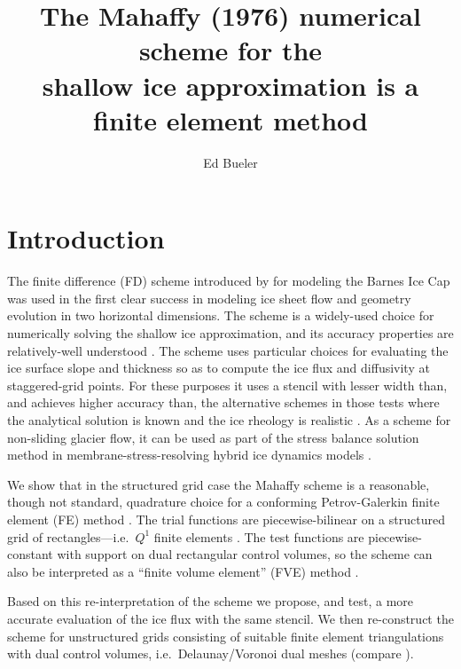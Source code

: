 \documentclass[11pt]{amsart}
\title[The Mahaffy scheme is a finite element method]{The Mahaffy (1976) numerical scheme for the \\ shallow ice approximation is a finite element method}
\author{Ed Bueler}
\begin{document}

\maketitle

\thispagestyle{empty}


\section{Introduction}

The finite difference (FD) scheme introduced by \cite{Mahaffy1976} for modeling the Barnes Ice Cap was used in the first clear success in modeling ice sheet flow and geometry evolution in two horizontal dimensions.  The scheme is a widely-used choice for numerically solving the shallow ice approximation, and its accuracy properties are relatively-well understood \cite{Bueleretal2005}.  The scheme uses particular choices for evaluating the ice surface slope and thickness so as to compute the ice flux and diffusivity at staggered-grid points.  For these purposes it uses a stencil with lesser width than, and achieves higher accuracy than, the alternative schemes in those tests where the analytical solution is known and the ice rheology is realistic \cite{HindmarshPayne1996}.  As a scheme for non-sliding glacier flow, it can be used as part of the stress balance solution method in membrane-stress-resolving hybrid ice dynamics models \cite{BuelerBrown2009}.

We show that in the structured grid case the Mahaffy scheme is a reasonable, though not standard, quadrature choice for a conforming Petrov-Galerkin finite element (FE) method \cite{Elmanetal2005}.  The trial functions are piecewise-bilinear on a structured grid of rectangles---i.e.~$Q^1$ finite elements \cite{Elmanetal2005}.  The test functions are piecewise-constant with support on dual rectangular control volumes, so the scheme can also be interpreted as a ``finite volume element'' (FVE) method \cite{EwingLinLin2002}.

Based on this re-interpretation of the scheme we propose, and test, a more accurate evaluation of the ice flux with the same stencil.  We then re-construct the scheme for unstructured grids consisting of suitable finite element triangulations with dual control volumes, i.e.~Delaunay/Voronoi dual meshes (compare \cite{Ringleretal2013}).
\end{document}
